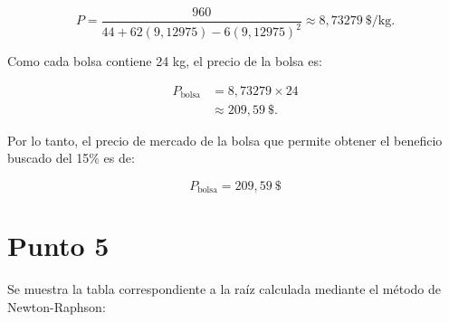 \begin{equation}
    P = \frac{960}{44 + 62(9{,}12975) - 6(9{,}12975)^2}
    \approx 8{,}73279\ \$/\text{kg}.
\end{equation}

Como cada bolsa contiene 24 kg, el precio de la bolsa es:

\begin{equation}
\begin{aligned}
P_{\text{bolsa}} &= 8{,}73279 \times 24 \\
&\approx \boxed{209{,}59\ \$}.
\end{aligned}
\end{equation}

Por lo tanto, el precio de mercado de la bolsa que permite obtener el beneficio buscado del 15\% es de:

\begin{equation}
    \boxed{P_{\text{bolsa}} = 209{,}59\ \$}
\end{equation}


\section{Punto 5}

Se muestra la tabla correspondiente a la raíz calculada mediante el método de Newton-Raphson:

\begin{table}[htbp]
\centering
{}
\caption{Resultado de la raíz del Punto 5 por el método de Newton-Raphson.}
\label{tab:punto5}
\end{table}

